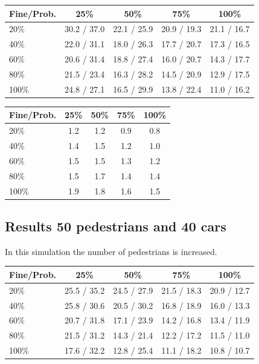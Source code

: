 \documentclass[a4paper]{article}
\begin{document}
\begin{table}[H]
\centering
\begin{tabular}{ l | c c c c }
  Fine\slash Prob. & 25\% & 50\% & 75\% & 100\% \\ 
  \hline
  20\%  & 30.2 / 37.0 & 22.1 / 25.9 & 20.9 / 19.3 & 21.1 / 16.7  \\
  40\%  & 22.0 / 31.1 & 18.0 / 26.3 & 17.7 / 20.7 & 17.3 / 16.5  \\
  60\%  & 20.6 / 31.4 & 18.8 / 27.4 & 16.0 / 20.7 & 14.3 / 17.7  \\
  80\%  & 21.5 / 23.4 & 16.3 / 28.2 & 14.5 / 20.9 & 12.9 / 17.5  \\
  100\% & 24.8 / 27.1 & 16.5 / 29.9 & 13.8 / 22.4 & 11.0 / 16.2  \\
\end{tabular}
\end{table}

\begin{table}[H]
\centering
\begin{tabular}{ l | c c c c }
  Fine\slash Prob. & 25\% & 50\% & 75\% & 100\% \\ 
  \hline
  20\%  & 1.2 & 1.2 & 0.9 & 0.8  \\
  40\%  & 1.4 & 1.5 & 1.2 & 1.0  \\
  60\%  & 1.5 & 1.5 & 1.3 & 1.2  \\
  80\%  & 1.5 & 1.7 & 1.4 & 1.4  \\
  100\% & 1.9 & 1.8 & 1.6 & 1.5  \\
\end{tabular}
\end{table}

\subsection{Results 50 pedestrians and 40 cars}
In this simulation the number of pedestrians is increased.

\begin{table}[H]
\centering
\begin{tabular}{ l | c c c c }
  Fine\slash Prob. & 25\% & 50\% & 75\% & 100\% \\ 
  \hline
  20\%  & 25.5 / 35.2 & 24.5 / 27.9 & 21.5 / 18.3 & 20.9 / 12.7  \\
  40\%  & 25.8 / 30.6 & 20.5 / 30.2 & 16.8 / 18.9 & 16.0 / 13.3  \\
  60\%  & 20.7 / 31.8 & 17.1 / 23.9 & 14.2 / 16.8 & 13.4 / 11.9  \\
  80\%  & 21.5 / 31.2 & 14.3 / 21.4 & 12.2 / 17.2 & 11.5 / 11.0  \\
  100\% & 17.6 / 32.2 & 12.8 / 25.4 & 11.1 / 18.2 & 10.8 / 10.7  \\
\end{tabular}
\end{table}
\end{document}
